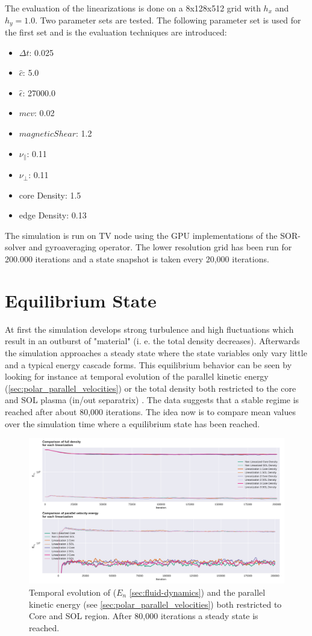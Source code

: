 \documentclass[master.tex]{subfiles}
\begin{document}
The evaluation of the linearizations is done on a 8x128x512 grid with $h_x$ and $h_y=1.0$. Two parameter sets are tested. The following parameter set is used for the first set and is the evaluation techniques are introduced:
\begin{itemize}
    \item $\Delta t$: 0.025
    \item $\hat{c}$: 5.0
    \item $\hat{\epsilon}$: 27000.0
    \item $mcv$: 0.02
    \item $magnetic Shear$: 1.2
    \item $\nu_{\parallel}$: 0.11
    \item $\nu_{\perp}$: 0.11
    \item core Density: 1.5
    \item edge Density: 0.13
\end{itemize}
The simulation is run on \ac{TV} node using the GPU implementations of the \ac{SOR}-solver and gyroaveraging operator. The lower resolution grid has been run for 200.000 iterations and a state snapshot is taken every 20,000 iterations.

\section{Equilibrium State}
At first the simulation develops strong turbulence and high fluctuations which result in an outburst of "material" (i. e. the total density decreases). Afterwards the simulation approaches a steady state where the state variables only vary little and a typical energy cascade forms. This equilibrium behavior can be seen by looking for instance at temporal evolution of the parallel kinetic energy (\autoref{sec:polar_parallel_velocities}) or the total density both restricted to the core and \ac{SOL} plasma (in/out separatrix) . The data suggests that a stable regime is reached after about 80,000 iterations. The idea now is to compare mean values over the simulation time where a equilibrium state has been reached. 

\begin{figure}[!hbtp]
    \includegraphics[width=\linewidth]{pdfs/equilibrium_state_low.pdf}
    \caption{Temporal evolution of ($E_n$ \autoref{sec:fluid-dynamics}) and the parallel kinetic energy (see \autoref{sec:polar_parallel_velocities}) both restricted to Core and \ac{SOL} region. After 80,000 iterations a steady state is reached.}
\end{figure}
\end{document}
